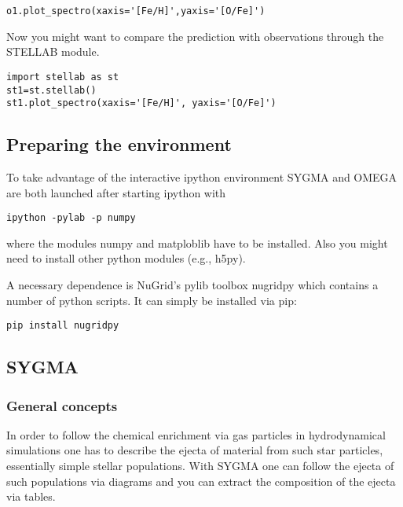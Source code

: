 \begin{verbatim}
o1.plot_spectro(xaxis='[Fe/H]',yaxis='[O/Fe]')
\end{verbatim}

Now you might want to compare the prediction with
observations through the STELLAB module.

\begin{verbatim}
import stellab as st
st1=st.stellab()
st1.plot_spectro(xaxis='[Fe/H]', yaxis='[O/Fe]')
\end{verbatim}





\subsection{Preparing the environment}%

To take advantage of the interactive ipython environment 
SYGMA and OMEGA are both launched after starting
ipython with


\begin{verbatim}
ipython -pylab -p numpy
\end{verbatim}

where the modules numpy and matploblib have to be installed.
Also you might need to install other python modules (e.g., h5py).

A necessary dependence is NuGrid's pylib toolbox nugridpy which
contains a number of python scripts.  It can simply be installed via
pip:

\begin{verbatim}
pip install nugridpy
\end{verbatim}



\subsection{SYGMA}

\subsubsection{General concepts}

In order to follow the chemical enrichment via gas particles
in hydrodynamical simulations one has to describe the ejecta of material
from such star particles, essentially simple stellar populations. 
With SYGMA one can follow the ejecta of such populations via
diagrams and you can extract the composition of the ejecta via tables.


